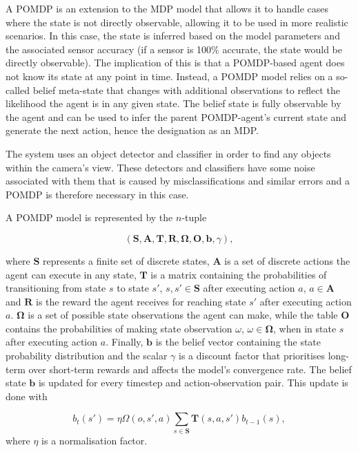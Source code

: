 \documentclass[runningheads]{llncs}
\begin{document}
A POMDP is an extension to the MDP model that allows it to handle cases where the state is not directly observable, allowing it to be used in more realistic scenarios. 
In this case, the state is inferred based on the model parameters and the associated sensor accuracy (if a sensor is 100\% accurate, the state would be directly observable).
The implication of this is that a POMDP-based agent does not know its state at any point in time.
Instead, a POMDP model relies on a so-called belief meta-state that changes with additional observations to reflect the likelihood the agent is in any given state.
The belief state is fully observable by the agent and can be used to infer the parent POMDP-agent's current state and generate the next action, hence the designation as an MDP.\@

The system uses an object detector and classifier in order to find any objects within the camera's view.
These detectors and classifiers have some noise associated with them that is caused by misclassifications and similar errors and a POMDP is therefore necessary in this case.

A POMDP model is represented by the $n$-tuple

\begin{equation}
  (\mathbf{S}, \mathbf{A}, \mathbf{T}, \mathbf{R}, \mathbf{\Omega}, \mathbf{O}, \mathbf{b}, \gamma),
\end{equation}

\noindent where $\mathbf{S}$ represents a finite set of discrete states, $\mathbf{A}$ is a set of discrete actions the agent can execute in any state, $\mathbf{T}$ is a matrix containing the probabilities of transitioning from state $s$ to state $s'$, $s, s' \in \mathbf{S}$ after executing action $a$, $a \in \mathbf{A}$ and $\mathbf{R}$ is the reward the agent receives for reaching state $s'$ after executing action $a$.
$\mathbf{\Omega}$ is a set of possible state observations the agent can make, while the table $\mathbf{O}$ contains the probabilities of making state observation $\omega$, $\omega \in \mathbf{\Omega}$, when in state $s$ after executing action $a$.
Finally, $\mathbf{b}$ is the belief vector containing the state probability distribution and the scalar $\gamma$ is a discount factor that prioritises long-term over short-term rewards and affects the model's convergence rate. 
The belief state $\mathbf{b}$ is updated for every timestep and action-observation pair.
This update is done with

\begin{equation}
  b_t(s') = \eta\Omega(o, s', a)\sum_{s\in\mathbf{S}}\mathbf{T}(s, a, s')b_{t-1}(s), 
\end{equation}
where $\eta$ is a normalisation factor. 
\end{document}
